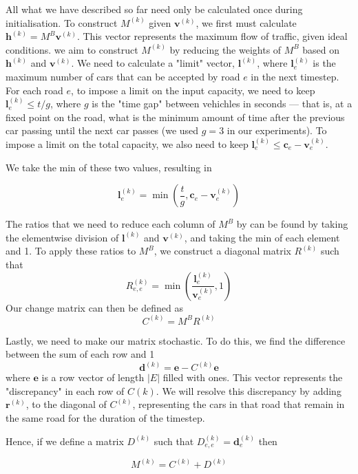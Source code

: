 \documentclass[a4paper]{article}
\begin{document}
All what we have described so far need only be calculated once during initialisation. To construct $M^{(k)}$ given $\mathbf{v}^{(k)}$, we first must calculate
$\mathbf{h}^{(k)} = M^B \mathbf{v}^{(k)}$. This vector represents the maximum flow of traffic, given ideal conditions.
we aim to construct $M^{(k)}$ by reducing the weights of $M^B$ based on $\mathbf{h}^{(k)}$ and $\mathbf{v}^{(k)}$. We need to calculate a "limit" vector, $\mathbf{l}^{(k)}$, where
$\mathbf{l}^{(k)}_e$ is the maximum number of cars that can be accepted by road $e$ in the next timestep.
For each road $e$, to impose a limit on the input capacity, we need to keep $\mathbf{l}^{(k)}_e \leq t/g$,
where $g$ is the "time gap" between vehichles in seconds --- that is, at a fixed point on the road, what is the minimum amount of time after the previous car passing until the next car passes (we used $g = 3$ in our experiments).
To impose a limit on the total capacity, we also need to keep $\mathbf{l}^{(k)}_e \leq \mathbf{c}_e - \mathbf{v}^{(k)}_e$.

We take the min of these two values, resulting in

$$\mathbf{l}^{(k)}_e = \min \left(\frac{t}{g}, \mathbf{c}_e - \mathbf{v}^{(k)}_e \right)$$

The ratios that we need to reduce each column of $M^B$ by can be found by taking the elementwise division of $\mathbf{l}^{(k)}$ and $\mathbf{v}^{(k)}$,
and taking the min of each element and 1. To apply these ratios to $M^B$, we construct a diagonal matrix $R^{(k)}$ such that 
$$
R^{(k)}_{e, e} = \min\left(\frac{\mathbf{l}^{(k)}_e}{\mathbf{v}^{(k)}_e}, 1 \right)
$$
Our change matrix can then be defined as
$$
C^{(k)} = M^B R^{(k)}
$$

Lastly, we need to make our matrix stochastic. To do this, we find the difference between the sum of each row and 1
$$
\mathbf{d}^{(k)} = \mathbf{e} - C^{(k)} \mathbf{e}
$$
where $\mathbf{e}$ is a row vector of length $|E|$ filled with ones.
This vector represents the "discrepancy" in each row of $C{(k)}$. We will resolve this discrepancy by adding $\mathbf{r}^{(k)}$, to the diagonal of $C^{(k)}$, representing
the cars in that road that remain in the same road for the duration of the timestep.

Hence, if we define a matrix $D^{(k)}$ such that $ D^{(k)}_{e, e} = \mathbf{d}^{(k)}_e $ then

$$M^{(k)} = C^{(k)} + D^{(k)}$$

\printbibliography
\end{document}
